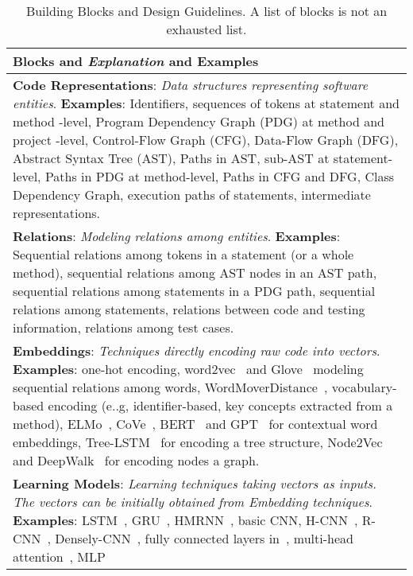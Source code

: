 \begin{table}[h]
	\vspace{-15pt}
	
	
	\begin{center}
		\footnotesize{
			\caption{Building Blocks and Design Guidelines. A list of blocks is not an exhausted list.}\label{framework}
			\vspace{-10pt}
		\begin{tabular}{p{16.5cm}<{\centering\raggedright}}
				
				\hline
			\textbf{Blocks} and \textbf{\textit{Explanation}} and \textbf{Examples}\\
				\hline
				
			\textbf{Code Representations}: \textit{Data structures representing software entities}. \textbf{Examples}: Identifiers, sequences of tokens at statement and method -level, Program Dependency Graph (PDG) at method and project -level, Control-Flow Graph (CFG), Data-Flow Graph (DFG), Abstract Syntax Tree (AST), Paths in AST, sub-AST at statement-level, Paths in PDG at method-level, Paths in CFG and DFG, Class Dependency Graph, execution paths of statements, intermediate representations.\\
				\hline
			\textbf{Relations}: \textit{Modeling relations among entities}. 
			\textbf{Examples}: Sequential relations among tokens in a statement (or a whole method), sequential relations among AST nodes in an AST path, 			sequential relations among statements in a PDG path, sequential relations among statements, relations between code and testing information, relations among test cases.  \\
				\hline
			\textbf{Embeddings}: \textit{Techniques directly encoding raw code into vectors}. 
			\textbf{Examples}: one-hot encoding, word2vec~\cite{word2vec} and Glove~\cite{Glovepennington2014glove} modeling sequential relations among words, WordMoverDistance~\cite{huang2016supervised}, vocabulary-based encoding (e..g, identifier-based, key concepts extracted from a method), ELMo~\cite{peters2019knowledge}, CoVe~\cite{mccann2017learned}, BERT~\cite{devlin2018bert} and GPT~\cite{GPTradford2018improvingGPT} for contextual word embeddings, Tree-LSTM~\cite{Tai-2015} for encoding a tree structure, Node2Vec~\cite{Grover-2016} and DeepWalk~\cite{perozzi2014deepwalk} for encoding nodes a graph.\\
				\hline
			\textbf{Learning Models}: \textit{Learning techniques taking vectors as inputs. The vectors can be initially obtained from Embedding techniques}. \textbf{Examples}: LSTM~\cite{hochreiter1997long}, GRU~\cite{Cho-2014}, HMRNN~\cite{chung2016hierarchical}, basic CNN, H-CNN~\cite{gao2018hierarchical}, R-CNN~\cite{girshick2015region}, Densely-CNN~\cite{wang2018densely}, fully connected layers in~\cnn, multi-head attention~\cite{Vaswani-2017}, MLP~\cite{bourlard1988auto}\\
			\hline
			

\end{tabular}}
\end{center}
\end{table}
